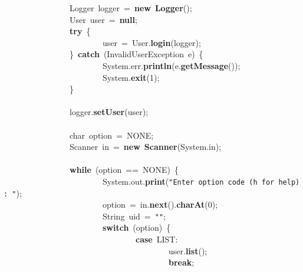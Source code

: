 \mbox{}\ \ \ \ \ \ \ \ \ \ \ \ \ \ \ \ Logger\ logger\ =\ \textbf{new}\ \textbf{Logger}(); \\
\mbox{}\ \ \ \ \ \ \ \ \ \ \ \ \ \ \ \ User\ user\ =\ \textbf{null}; \\
\mbox{}\ \ \ \ \ \ \ \ \ \ \ \ \ \ \ \ \textbf{try}\ \{ \\
\mbox{}\ \ \ \ \ \ \ \ \ \ \ \ \ \ \ \ \ \ \ \ \ \ \ \ user\ =\ User.\textbf{login}(logger); \\
\mbox{}\ \ \ \ \ \ \ \ \ \ \ \ \ \ \ \ \}\ \textbf{catch}\ (InvalidUserException\ e)\ \{ \\
\mbox{}\ \ \ \ \ \ \ \ \ \ \ \ \ \ \ \ \ \ \ \ \ \ \ \ System.err.\textbf{println}(e.\textbf{getMessage}()); \\
\mbox{}\ \ \ \ \ \ \ \ \ \ \ \ \ \ \ \ \ \ \ \ \ \ \ \ System.\textbf{exit}(1); \\
\mbox{}\ \ \ \ \ \ \ \ \ \ \ \ \ \ \ \ \} \\
\mbox{}\ \ \ \ \ \ \ \ \ \ \ \ \ \ \ \  \\
\mbox{}\ \ \ \ \ \ \ \ \ \ \ \ \ \ \ \ logger.\textbf{setUser}(user); \\
\mbox{} \\
\mbox{}\ \ \ \ \ \ \ \ \ \ \ \ \ \ \ \ char\ option\ =\ NONE; \\
\mbox{}\ \ \ \ \ \ \ \ \ \ \ \ \ \ \ \ Scanner\ in\ =\ \textbf{new}\ \textbf{Scanner}(System.in); \\
\mbox{} \\
\mbox{}\ \ \ \ \ \ \ \ \ \ \ \ \ \ \ \ \textbf{while}\ (option\ ==\ NONE)\ \{ \\
\mbox{}\ \ \ \ \ \ \ \ \ \ \ \ \ \ \ \ \ \ \ \ \ \ \ \ System.out.\textbf{print}(\texttt{"{}Enter\ option\ code\ (h\ for\ help):\ "{}}); \\
\mbox{}\ \ \ \ \ \ \ \ \ \ \ \ \ \ \ \ \ \ \ \ \ \ \ \ option\ =\ in.\textbf{next}().\textbf{charAt}(0); \\
\mbox{}\ \ \ \ \ \ \ \ \ \ \ \ \ \ \ \ \ \ \ \ \ \ \ \ String\ uid\ =\ \texttt{"{}"{}}; \\
\mbox{}\ \ \ \ \ \ \ \ \ \ \ \ \ \ \ \ \ \ \ \ \ \ \ \ \textbf{switch}\ (option)\ \{ \\
\mbox{}\ \ \ \ \ \ \ \ \ \ \ \ \ \ \ \ \ \ \ \ \ \ \ \ \ \ \ \ \ \ \ \ \textbf{case}\ LIST: \\
\mbox{}\ \ \ \ \ \ \ \ \ \ \ \ \ \ \ \ \ \ \ \ \ \ \ \ \ \ \ \ \ \ \ \ \ \ \ \ \ \ \ \ user.\textbf{list}(); \\
\mbox{}\ \ \ \ \ \ \ \ \ \ \ \ \ \ \ \ \ \ \ \ \ \ \ \ \ \ \ \ \ \ \ \ \ \ \ \ \ \ \ \ \textbf{break}; \\
